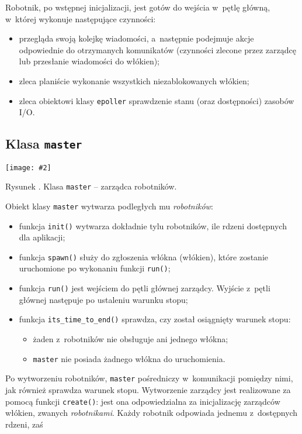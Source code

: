 \documentclass[12pt]{mwart}
\newcommand{\code}{\texttt}
\newcounter{figmain}
\newcommand{\myownfigure}[4]{ \newcounter{#1} \setcounter{#1}{\value{figmain}} \addtocounter{figmain}{1} \begin{center} \label{fig:#1} \centering \texttt{[image: \#2]}\\ \nopagebreak[5] \parbox[t]{11.5cm}{Rysunek \arabic{#1}. #3.} \end{center}}
\begin{document}
\par
\indent
  Robotnik, po wstępnej inicjalizacji, jest gotów do wejścia w~pętlę główną, w~której wykonuje następujące czynności:
  \begin{itemize}
    \item przegląda swoją kolejkę wiadomości, a~następnie podejmuje akcje odpowiednie do otrzymanych komunikatów (czynności zlecone przez zarządcę 
      lub przesłanie wiadomości do włókien);
    \item zleca planiście wykonanie wszystkich niezablokowanych włókien;
    \item zleca obiektowi klasy \code{epoller} sprawdzenie stanu (oraz dostępności) zasobów I/O.
  \end{itemize}
\par
%
\subsection{Klasa \code{master}}
    \myownfigure{Master}{Master.png}{Klasa \code{master} -- zarządca robotników}{.7}
%
\indent
  Obiekt klasy \code{master} wytwarza podległych mu \emph{robotników}:  
  \begin{itemize}
    \item funkcja \code{init()} wytwarza dokładnie tylu robotników, ile rdzeni dostępnych dla aplikacji;
    \item funkcja \code{spawn()} służy do zgłoszenia włókna (włókien), które zostanie uruchomione po wykonaniu funkcji \code{run()};
    \item funkcja \code{run()} jest wejściem do pętli głównej zarządcy. Wyjście z~pętli głównej następuje po ustaleniu warunku stopu;
    \item funkcja \code{its\_time\_to\_end()} sprawdza, czy został osiągnięty warunek stopu:
      \begin{itemize}
        \item żaden z~robotników nie obsługuje ani jednego włókna;
        \item \code{master} nie posiada żadnego włókna do uruchomienia.
      \end{itemize}
  \end{itemize}
  Po wytworzeniu robotników, \code{master} pośredniczy w~komunikacji pomiędzy nimi, jak również sprawdza warunek stopu.
  Wytworzenie zarządcy jest realizowane za pomocą funkcji \code{create()}: 
  jest ona odpowiedzialna za inicjalizację zarządców włókien, zwanych \emph{robotnikami}.
  Każdy robotnik odpowiada jednemu z~dostępnych rdzeni, zaś
\end{document}
